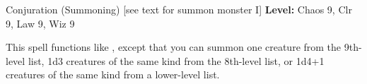 {Conjuration (Summoning) [see text for summon monster I]}
{
	\textbf{Level:}
	Chaos 9, Clr 9, Law 9, Wiz 9\\
}
{
	This spell functions like , except that you can summon one creature from the 9th-level list, 1d3 creatures of the same kind from the 8th-level list, or 1d4+1 creatures of the same kind from a lower-level list.

}
